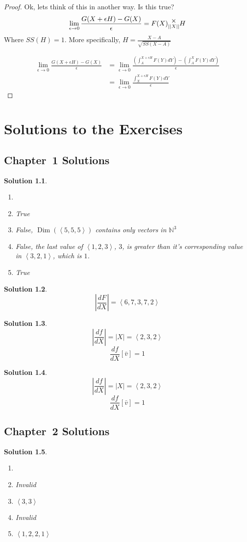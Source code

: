 \documentclass[12pt]{book}
\theoremstyle{definition}
\theoremstyle{plain}
\theoremstyle{ppart}
\theoremstyle{case}
\newcounter{solutionctr}
\theoremstyle{solution}
\newtheorem{solution}{Solution}
\newcommand{\solutionsection}[1]{
  \section{Chapter~#1 Solutions}\setcounter{solutionctr}{0}}
\DeclareMathOperator{\Dim}{Dim}
\newcommand{\mmult}[1]{\text{\raisebox{1ex}{$\underset{#1}{\times}$}}}
\begin{document}
\begin{landscape}
\begin{proof}
Ok, lets think of this in another way. Is this true?
\[
	\lim_{\epsilon \to 0}
	\frac{
		G(X+\epsilon H) - G(X)
	}{\epsilon}
	=
	F(X) \mmult{||X||} H
\]
Where $SS(H) = 1$. More specifically, $H = \frac{X-A}{\sqrt{SS(X-A)}}$

\begin{align*}
\lim_{\epsilon \to 0}
\frac{
	G(X+\epsilon H) - G(X)
}{\epsilon}
&= 
\lim_{\epsilon \to 0}
\frac{
	\left( \int_A^{X+\epsilon H} F(Y) dY \right) - \left( \int_A^X F(Y) dY \right)
}{\epsilon} \\
&= 
\lim_{\epsilon \to 0}
\frac{
	\int_X^{X+\epsilon H} F(Y) dY
}{\epsilon}
\end{align*}
\end{proof}
\end{landscape}

\chapter{Solutions to the Exercises}

\solutionsection{1}

\begin{solution}
\begin{enumerate}
\item[]
\item True
\item False, $\Dim(\left<5,5,5\right>)$ contains only vectors in $\mathbb{N}^3$ 
\item False, the last value of $\left<1,2,3\right>$, $3$, is greater than it's
						 corresponding value in $\left<3,2,1\right>$, which is $1$.
\item True
\end{enumerate}
\end{solution}

\begin{solution}
\[ \left|\frac{dF}{dX}\right| = \left<6,7,3,7,2\right> \]
\end{solution}

\begin{solution}
\[ \left|\frac{df}{dX}\right| = |X| = \left<2,3,2\right> \]
\[ \frac{df}{dX}[\bar{v}] = 1 \]
\end{solution}

\begin{solution}
\[ \left|\frac{df}{dX}\right| = |X| = \left<2,3,2\right> \]
\[ \frac{df}{dX}[\bar{v}] = 1 \]
\end{solution}

\solutionsection{2}

\begin{solution}
\begin{enumerate}
\item[]
\item Invalid
\item $\left<3, 3\right>$
\item Invalid
\item $\left<1, 2, 2, 1\right>$
\end{enumerate}
\end{solution}




\end{document}
